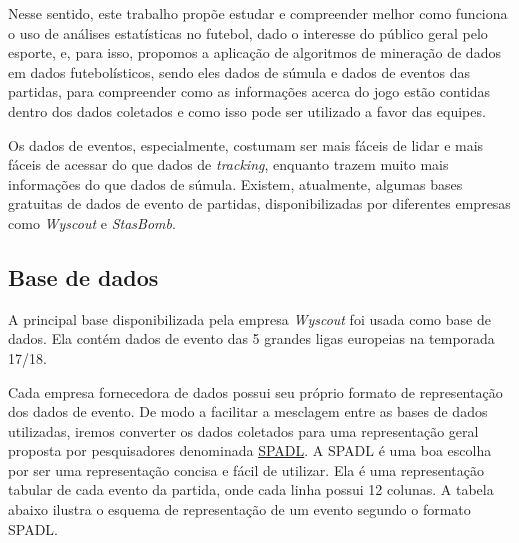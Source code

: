 \documentclass{article}
\begin{document}
Nesse sentido, este trabalho propõe estudar e compreender melhor como funciona
o uso de análises estatísticas no futebol, dado o interesse do público geral pelo esporte,
e, para isso, propomos a aplicação de algoritmos de mineração de dados em
dados futebolísticos, sendo eles dados de súmula e dados de eventos das partidas, 
para compreender como as informações acerca do
jogo estão contidas dentro dos dados coletados e como isso pode ser utilizado a
favor das equipes.

Os dados de eventos, especialmente, costumam ser mais fáceis de lidar e mais
fáceis de acessar do que dados de \textit{tracking}, enquanto trazem muito mais
informações do que dados de súmula. Existem, atualmente, algumas bases
gratuitas de dados de evento de partidas, disponibilizadas por diferentes
empresas como \textit{Wyscout} e \textit{StasBomb}.

\subsection{Base de dados}

A principal base disponibilizada pela empresa \textit{Wyscout} foi usada como
base de dados. Ela contém dados de evento das 5 grandes ligas europeias na
temporada 17/18.

Cada empresa fornecedora de dados possui seu próprio formato de representação
dos dados de evento. De modo a facilitar a mesclagem entre as bases de dados
utilizadas, iremos converter os dados coletados para uma representação geral
proposta por pesquisadores denominada
\href{https://socceraction.readthedocs.io/en/latest/documentation/spadl/spadl.html}{SPADL}.
A SPADL é uma boa escolha por ser uma representação concisa e fácil de
utilizar. Ela é uma representação tabular de cada evento da partida, onde cada
linha possui 12 colunas. A tabela abaixo ilustra o esquema de representação de
um evento segundo o formato SPADL.
\end{document}
